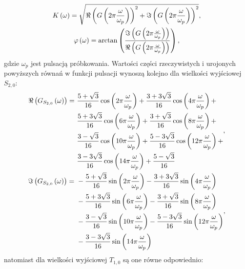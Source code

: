 \begin{gather}
K \left(\omega\right) = \sqrt{\Re \left( G \left( 2\pi \frac{\omega}{\omega_{p}} \right) \right)^{2} + \Im \left( G \left( 2\pi \frac{\omega}{\omega_{p}} \right) \right)^{2}} \label{eq:sym_partd_output_amp_w}, \\
\varphi \left(\omega\right) = \arctan \left( \frac{\Im \left( G \left( 2\pi \frac{\omega}{\omega_{p}} \right) \right)}{\Re \left( G \left( 2\pi \frac{\omega}{\omega_{p}} \right) \right)} \right) \label{eq:sym_partd_output_phi_w},
\end{gather}
gdzie $\omega_{p}$ jest pulsacją próbkowania. Wartości części rzeczywistych i urojonych powyższych równań w funkcji pulsacji wynoszą kolejno dla wielkości wyjściowej $S_{2,0}$:
\begin{gather}
\begin{split}
\Re \left( G_{S_{2,0}} \left(\omega\right) \right) = ~
& \frac{5 + \sqrt{3}}{16} \cos \left(2 \pi \frac{\omega}{\omega_{p}}\right) + \frac{3 + 3 \sqrt{3}}{16} \cos \left(4 \pi \frac{\omega}{\omega_{p}}\right) + \\
& \frac{5 + 3 \sqrt{3}}{16} \cos \left(6 \pi \frac{\omega}{\omega_{p}}\right) + \frac{3 + \sqrt{3}}{16} \cos \left(8 \pi \frac{\omega}{\omega_{p}}\right) + \\
& \frac{3 - \sqrt{3}}{16} \cos \left(10 \pi \frac{\omega}{\omega_{p}}\right) + \frac{5 - 3 \sqrt{3}}{16} \cos \left(12 \pi \frac{\omega}{\omega_{p}}\right) + \\
& \frac{3 - 3 \sqrt{3}}{16} \cos \left(14 \pi \frac{\omega}{\omega_{p}}\right) + \frac{5 - \sqrt{3}}{16}
\end{split}
\label{eq:sym_partd_output_trans_wn_re_S_2_0}, \\
\begin{split}
\Im \left( G_{S_{2,0}} \left(\omega\right) \right) = ~
& - \frac{5 + \sqrt{3}}{16} \sin \left(2 \pi \frac{\omega}{\omega_{p}}\right) - \frac{3 + 3 \sqrt{3}}{16} \sin \left(4 \pi \frac{\omega}{\omega_{p}}\right) \\
& - \frac{5 + 3 \sqrt{3}}{16} \sin \left(6 \pi \frac{\omega}{\omega_{p}}\right) - \frac{3 + \sqrt{3}}{16} \sin \left(8 \pi \frac{\omega}{\omega_{p}}\right) \\
& - \frac{3 - \sqrt{3}}{16} \sin \left(10 \pi \frac{\omega}{\omega_{p}}\right) - \frac{5 - 3 \sqrt{3}}{16} \sin \left(12 \pi \frac{\omega}{\omega_{p}}\right) \\
& - \frac{3 - 3 \sqrt{3}}{16} \sin \left(14 \pi \frac{\omega}{\omega_{p}}\right)
\end{split}
\label{eq:sym_partd_output_trans_wn_im_S_2_0},
\end{gather}
natomiast dla wielkości wyjściowej $T_{1,0}$ są one równe odpowiednio:
